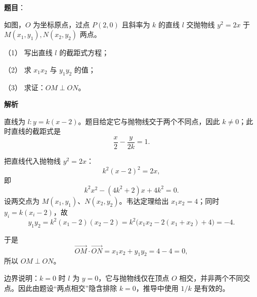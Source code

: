 \begin{answer}

\textbf{题目}：

如图，$O$ 为坐标原点，过点 $P(2,0)$ 且斜率为 $k$ 的直线 $l$ 交抛物线 $y^2=2x$ 于 $M(x_1,y_1),N(x_2,y_2)$ 两点。

（1） 写出直线 $l$ 的截距式方程；

（2） 求 $x_1x_2$ 与 $y_1y_2$ 的值；

（3） 求证：$OM\perp ON$。
\nopagebreak[4]
\begin{center}\end{center}
\nopagebreak[4]
\textbf{解析}


直线为 $l:y=k(x-2)$。题目给定它与抛物线交于两个不同点，因此 $k\ne0$；此时直线的截距式是
\nopagebreak[4]
\[
\frac{x}{2}-\frac{y}{2k}=1.
\]


把直线代入抛物线 $y^2=2x$：
\nopagebreak[4]
\[
k^2(x-2)^2=2x,
\]
即
\nopagebreak[4]
\[
k^2x^2-(4k^2+2)x+4k^2=0.
\]
设两交点为 $M(x_1,y_1)$、$N(x_2,y_2)$。韦达定理给出 $x_1x_2=4$；同时 $y_i=k(x_i-2)$，故
\nopagebreak[4]
\[
y_1y_2=k^2(x_1-2)(x_2-2)
=k^2\bigl(x_1x_2-2(x_1+x_2)+4\bigr)=-4.
\]


于是
\nopagebreak[4]
\[
\overrightarrow{OM}\cdot\overrightarrow{ON}=x_1x_2+y_1y_2=4-4=0,
\]
所以 $OM\perp ON$。

边界说明：$k=0$ 时 $l$ 为 $y=0$，它与抛物线仅在顶点 $O$ 相交，并非两个不同交点。因此由题设“两点相交”隐含排除 $k=0$，推导中使用 $1/k$ 是有效的。




\end{answer}
